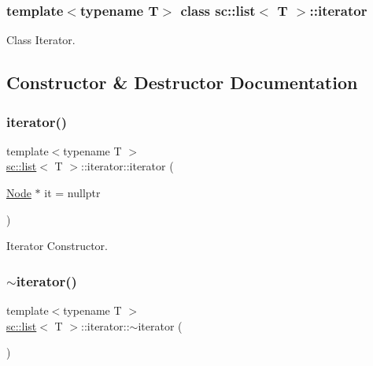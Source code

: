 \subsubsection*{template$<$typename T$>$\newline
class sc\+::list$<$ T $>$\+::iterator}

Class Iterator. 

\subsection{Constructor \& Destructor Documentation}
\mbox{\label{classsc_1_1list_1_1iterator_a70e7732135929fcc70a2d1bc79596454}} 
\subsubsection{\texorpdfstring{iterator()}{iterator()}}
{\footnotesize\ttfamily template$<$typename T $>$ \\
\hyperlink{classsc_1_1list}{sc\+::list}$<$ T $>$\+::iterator\+::iterator (\begin{DoxyParamCaption}\item[{\hyperlink{structsc_1_1list_1_1_node}{Node} $\ast$}]{it = {\ttfamily nullptr} }\end{DoxyParamCaption})\hspace{0.3cm}{\ttfamily [inline]}}



Iterator Constructor. 

\mbox{\label{classsc_1_1list_1_1iterator_a683f8fb965f0a3d5c5cf5b906aadbb26}} 
\subsubsection{\texorpdfstring{$\sim$iterator()}{~iterator()}}
{\footnotesize\ttfamily template$<$typename T $>$ \\
\hyperlink{classsc_1_1list}{sc\+::list}$<$ T $>$\+::iterator\+::$\sim$iterator (\begin{DoxyParamCaption}{ }\end{DoxyParamCaption})\hspace{0.3cm}{\ttfamily [inline]}}



